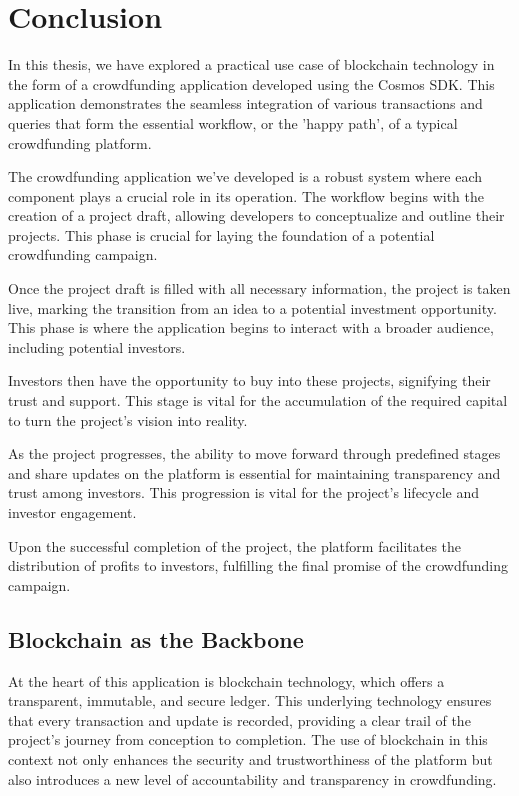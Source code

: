 \section{Conclusion}

In this thesis, we have explored a practical use case of blockchain technology in the form of a crowdfunding application developed using the Cosmos SDK. This application demonstrates the seamless integration of various transactions and queries that form the essential workflow, or the 'happy path', of a typical crowdfunding platform.

The crowdfunding application we've developed is a robust system where each component plays a crucial role in its operation. The workflow begins with the creation of a project draft, allowing developers to conceptualize and outline their projects. This phase is crucial for laying the foundation of a potential crowdfunding campaign.

Once the project draft is filled with all necessary information, the project is taken live, marking the transition from an idea to a potential investment opportunity. This phase is where the application begins to interact with a broader audience, including potential investors.

Investors then have the opportunity to buy into these projects, signifying their trust and support. This stage is vital for the accumulation of the required capital to turn the project's vision into reality.

As the project progresses, the ability to move forward through predefined stages and share updates on the platform is essential for maintaining transparency and trust among investors. This progression is vital for the project's lifecycle and investor engagement.

Upon the successful completion of the project, the platform facilitates the distribution of profits to investors, fulfilling the final promise of the crowdfunding campaign.

\subsection{Blockchain as the Backbone}

At the heart of this application is blockchain technology, which offers a transparent, immutable, and secure ledger. This underlying technology ensures that every transaction and update is recorded, providing a clear trail of the project's journey from conception to completion. The use of blockchain in this context not only enhances the security and trustworthiness of the platform but also introduces a new level of accountability and transparency in crowdfunding.

